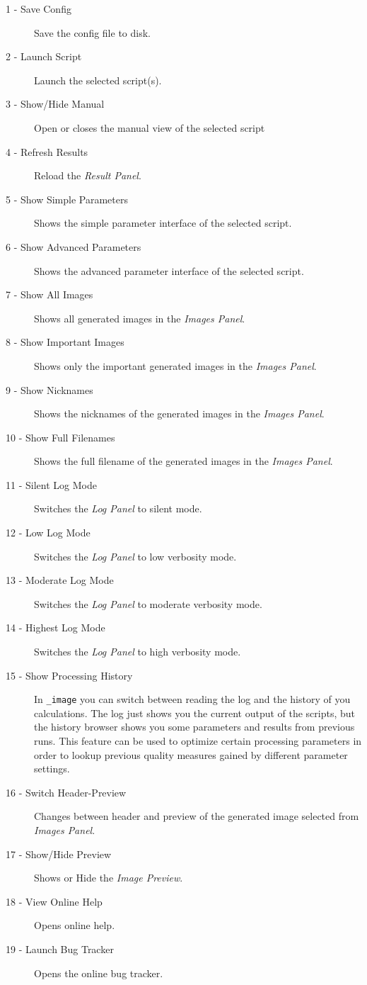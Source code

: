 \begin{description}
	\item[1 - Save Config] Save the config file to disk.
	\item[2 - Launch Script] Launch the selected script(s).
	\item[3 - Show/Hide Manual] Open or closes the manual view of the selected script
	\item[4 - Refresh Results] Reload the \textit{Result Panel}.
	\item[5 - Show Simple Parameters] Shows the simple parameter interface of the selected script.
	\item[6 - Show Advanced Parameters] Shows the advanced parameter interface of the selected script.
	\item[7 - Show All Images] Shows all generated images in the \textit{Images Panel}.
	\item[8 - Show Important Images] Shows only the important generated images in the \textit{Images Panel}.
	\item[9 - Show Nicknames] Shows the nicknames of the generated images in the \textit{Images Panel}.
	\item[10 - Show Full Filenames] Shows the full filename of the generated images in the \textit{Images Panel}.
	\item[11 - Silent Log Mode] Switches the \textit{Log Panel} to silent mode.
	\item[12 - Low Log Mode] Switches the \textit{Log Panel} to low verbosity mode.
	\item[13 - Moderate Log Mode] Switches the \textit{Log Panel} to moderate verbosity mode.
	\item[14 - Highest Log Mode] Switches the \textit{Log Panel} to high verbosity mode.
	\item[15 - Show Processing History] In {\twodx}\texttt{\_image} you can switch between reading the log and the history of you calculations. The log just shows you the current output of the scripts, but the history browser shows you some parameters and results from previous runs. This feature can be used to optimize certain processing parameters in order to lookup previous quality measures gained by different parameter settings.
	\item[16 - Switch Header-Preview] Changes between header and preview of the generated image selected from \textit{Images Panel}.
	\item[17 - Show/Hide Preview] Shows or Hide the \textit{Image Preview}.
	\item[18 - View Online Help] Opens online help.
	\item[19 - Launch Bug Tracker] Opens the online bug tracker.
\end{description}

